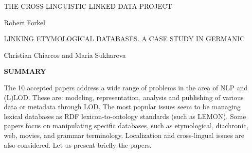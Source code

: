 \documentclass{article}
\begin{document}
\vspace{12pt}
THE CROSS-LINGUISTIC LINKED DATA PROJECT

Robert Forkel

\vspace{12pt}
LINKING ETYMOLOGICAL DATABASES. A CASE STUDY IN GERMANIC

Christian Chiarcos and Maria Sukhareva

\vspace{12pt}
\begin{center}
\textbf{SUMMARY}
\end{center}

\vspace{24pt}
\baselineskip=12pt
\leftskip=0pt
The 10 accepted papers address a wide range of problems in the area of NLP and 
(L)LOD. These are: modeling, representation, analysis and publishing of various 
data or metadata through LOD. The most popular issues seem to be managing lexical 
databases as RDF lexicon-to-ontology standards (such as LEMON). Some papers focus 
on manipulating specific databases, such as etymological, diachronic, web, movies, 
and grammar terminology. Localization and cross-lingual issues are also considered. 
Let us present briefly the papers.
\end{document}
